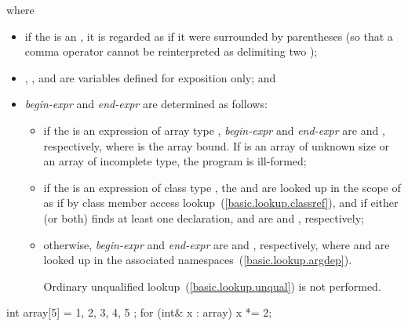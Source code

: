 where

\begin{itemize}
\item 
if the  is an ,
it is regarded as if it were surrounded by parentheses (so that a comma operator
cannot be reinterpreted as delimiting two );

\item {}, , and  are variables defined for
exposition only; and

\item
\textit{begin-expr} and \textit{end-expr} are determined as follows:

\begin{itemize}
\item if the  is an expression of
array type , \textit{begin-expr} and \textit{end-expr} are
 and , respectively, where  is
the array bound. If  is an array of unknown size or an array of
incomplete type, the program is ill-formed;

\item if the  is an expression of
class type , the 
 and  are looked up in the scope of 
as if by class member access lookup~(\ref{basic.lookup.classref}), and if either
(or both) finds at least one declaration,  and
 are  and ,
respectively;

\item otherwise, \textit{begin-expr} and \textit{end-expr} are 
and , respectively, where  and  are looked
up in the associated namespaces~(\ref{basic.lookup.argdep}).
\begin{note} Ordinary unqualified lookup~(\ref{basic.lookup.unqual}) is not
performed. \end{note}
\end{itemize}
\end{itemize}

\begin{example}
\begin{codeblock}
int array[5] = { 1, 2, 3, 4, 5 };
for (int& x : array)
  x *= 2;
\end{codeblock}
\end{example}

